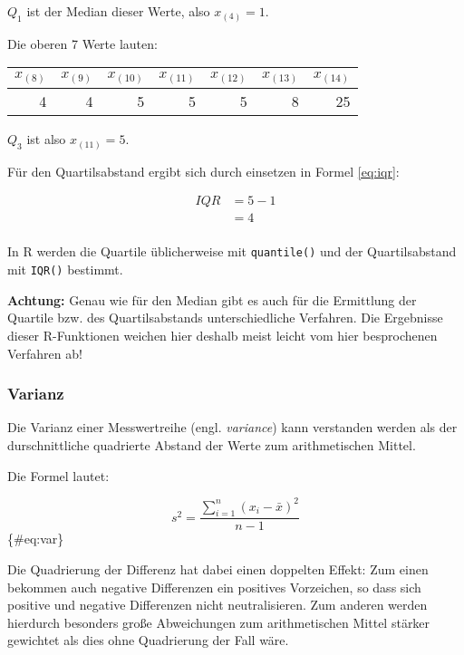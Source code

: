 \documentclass[
  ngerman,
]{article}
\begin{document}
\(Q_1\) ist der Median dieser Werte, also \(x_{(4)}=1\).

Die oberen 7 Werte lauten:

\begin{table}[H]
\centering
\begin{tabular}{rrrrrrr}
\toprule
$x_{(8)}$ & $x_{(9)}$ & $x_{(10)}$ & $x_{(11)}$ & $x_{(12)}$ & $x_{(13)}$ & $x_{(14)}$\\
\midrule
4 & 4 & 5 & 5 & 5 & 8 & 25\\
\bottomrule
\end{tabular}
\end{table}

\(Q_3\) ist also \(x_{(11)} = 5\).

Für den Quartilsabstand ergibt sich durch einsetzen in Formel \ref{eq:iqr}:

\[
  \begin{aligned}
    \mathit{IQR}&=5-1 \\[4pt]
       &=4 \\[4pt]
  \end{aligned}
\]

\begin{rtip}
In R werden die Quartile üblicherweise mit {\tt quantile()} und der Quartilsabstand mit {\tt IQR()} bestimmt.

\medskip

\textbf{Achtung:} Genau wie für den Median gibt es auch für die Ermittlung der Quartile bzw. des Quartilsabstands unterschiedliche Verfahren. Die Ergebnisse dieser R-Funktionen weichen hier deshalb meist leicht vom hier besprochenen Verfahren ab!
\end{rtip}

\hypertarget{varianz}{%
\subsubsection{Varianz}\label{varianz}}

Die Varianz einer Messwertreihe (engl. \emph{variance}) kann verstanden werden als der durschnittliche quadrierte Abstand der Werte zum arithmetischen Mittel.

Die Formel lautet:

\[s^2=\frac{\sum\limits_{i=1}^{n}(x_{i}-\bar{x})^2}{n-1}\]\{\#eq:var\}

Die Quadrierung der Differenz hat dabei einen doppelten Effekt: Zum einen bekommen auch negative Differenzen ein positives Vorzeichen, so dass sich positive und negative Differenzen nicht neutralisieren. Zum anderen werden hierdurch besonders große Abweichungen zum arithmetischen Mittel stärker gewichtet als dies ohne Quadrierung der Fall wäre.
\end{document}
